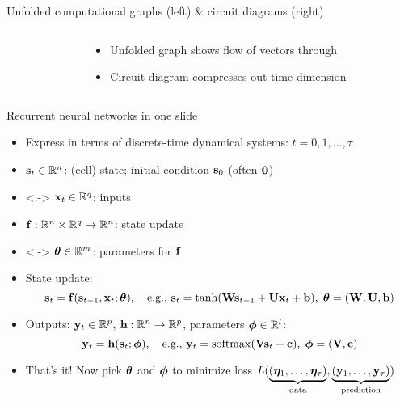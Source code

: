 \begin{frame}{Unfolded computational graphs (left) \& circuit diagrams (right)}
    \begin{columns}
        \begin{column}{0.71\textwidth}
            \uncover<+->{}
            \uncover<+->{}
        \end{column}
        \begin{column}{0.29\textwidth}
            \begin{itemize}
                \item<1-> Unfolded graph shows flow of vectors through \rnn
                \item<2-> Circuit diagram compresses out time dimension
            \end{itemize}
        \end{column}
    \end{columns}
\end{frame}

\begin{frame}{Recurrent neural networks in one slide}
    \begin{itemize}[<+->]
        \item Express in terms of discrete-time dynamical systems: $t = 0, 1, \dots, \tau$
        \item $\mathbf{s}_t \in \mathbb{R}^n$: (cell) state; initial condition $\mathbf{s}_0$ (often $\mathbf{0}$)
        \item<.-> $\mathbf{x}_t \in \mathbb{R}^q$: inputs
        \item $\mathbf{f}: \mathbb{R}^n \times \mathbb{R}^q \to \mathbb{R}^n$: state update
        \item<.-> $\bm{\theta} \in \mathbb{R}^m$: parameters for $\mathbf{f}$
        \item State update:
        \begin{equation*}
            \mathbf{s}_t = \mathbf{f}(\mathbf{s}_{t-1}, \mathbf{x}_t; \bm{\theta}),
            \quad \text{e.g.}, \,
            \mathbf{s}_t = \tanh(\mathbf{W} \mathbf{s}_{t-1} + \mathbf{U} \mathbf{x}_t + \mathbf{b}), \;
            \bm{\theta} = (\mathbf{W}, \mathbf{U}, \mathbf{b})
        \end{equation*}
        \item Outputs: $\mathbf{y}_t \in \mathbb{R}^p$, $\mathbf{h}: \mathbb{R}^n \to \mathbb{R}^p$, parameters $\bm{\phi} \in \mathbb{R}^l$:
        \begin{equation*}
            \mathbf{y}_t = \mathbf{h}(\mathbf{s}_t; \bm{\phi}),
            \quad \text{e.g.}, \,
            \mathbf{y}_t = \mathrm{softmax}(\mathbf{V} \mathbf{s}_{t} + \mathbf{c}), \;
            \bm{\phi} = (\mathbf{V}, \mathbf{c})
        \end{equation*}
        \item That's it!  Now pick $\bm{\theta}$ and $\bm{\phi}$ to minimize loss $L(
            \underbrace{(\bm{\eta}_1, \dots, \bm{\eta}_\tau)}_\text{data},
            \underbrace{(\mathbf{y}_1, \dots, \mathbf{y}_\tau)}_\text{prediction}
        )$
    \end{itemize}
\end{frame}

